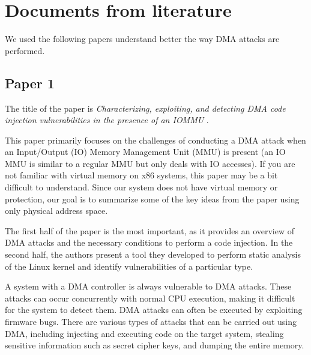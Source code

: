 \chapter{Documents from literature} \label{CH_lit}
We used the following papers understand better the way DMA attacks are performed. 

\section{Paper 1}
The title of the paper is \textit{Characterizing, exploiting, and detecting DMA code injection vulnerabilities in the presence of an IOMMU} \cite{10.1145/3447786.3456249}.

This paper primarily focuses on the challenges of conducting a DMA attack when an Input/Output (IO) Memory Management Unit (MMU) is present (an IO MMU is similar to a regular MMU but only deals with IO accesses). If you are not familiar with virtual memory on x86 systems, this paper may be a bit difficult to understand. Since our system does not have virtual memory or protection, our goal is to summarize some of the key ideas from the paper using only physical address space. 

The first half of the paper is the most important, as it provides an overview of DMA attacks and the necessary conditions to perform a code injection. In the second half, the authors present a tool they developed to perform static analysis of the Linux kernel and identify vulnerabilities of a particular type.

A system with a DMA controller is always vulnerable to DMA attacks. These attacks can occur concurrently with normal CPU execution, making it difficult for the system to detect them. DMA attacks can often be executed by exploiting firmware bugs. There are various types of attacks that can be carried out using DMA, including injecting and executing code on the target system, stealing sensitive information such as secret cipher keys, and dumping the entire memory.


